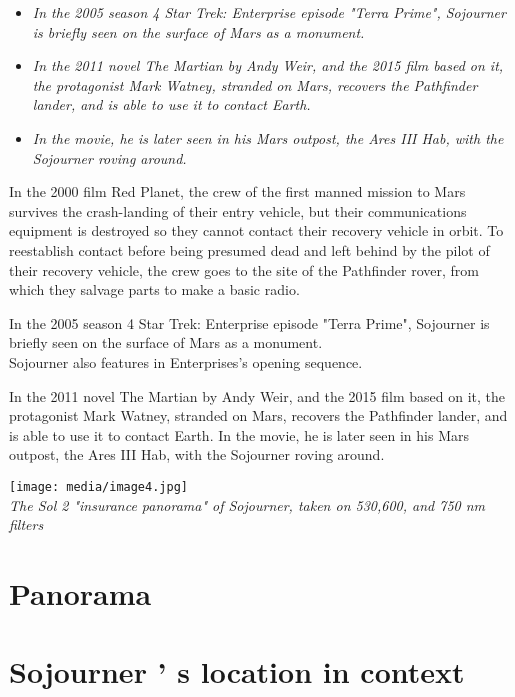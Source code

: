 \begin{itemize}
\item
  \emph{In the 2005 season 4 Star Trek: Enterprise episode "Terra
  Prime", Sojourner is briefly seen on the surface of Mars as a
  monument.}
\item
  \emph{In the 2011 novel The Martian by Andy Weir, and the 2015 film
  based on it, the protagonist Mark Watney, stranded on Mars, recovers
  the Pathfinder lander, and is able to use it to contact Earth.}
\item
  \emph{In the movie, he is later seen in his Mars outpost, the Ares III
  Hab, with the Sojourner roving around.}
\end{itemize}

In the 2000 film Red Planet, the crew of the first manned mission to
Mars survives the crash-landing of their entry vehicle, but their
communications equipment is destroyed so they cannot contact their
recovery vehicle in orbit. To reestablish contact before being presumed
dead and left behind by the pilot of their recovery vehicle, the crew
goes to the site of the Pathfinder rover, from which they salvage parts
to make a basic radio.

In the 2005 season 4 Star Trek: Enterprise episode "Terra Prime",
Sojourner is briefly seen on the surface of Mars as a monument.\\
Sojourner also features in Enterprises's opening sequence.

In the 2011 novel The Martian by Andy Weir, and the 2015 film based on
it, the protagonist Mark Watney, stranded on Mars, recovers the
Pathfinder lander, and is able to use it to contact Earth. In the movie,
he is later seen in his Mars outpost, the Ares III Hab, with the
Sojourner roving around.

\texttt{[image: media/image4.jpg]}\\
\emph{The Sol 2 "insurance panorama" of Sojourner, taken on 530,600, and
750 nm filters}

\section{Panorama}\label{panorama}

\section{Sojourner ' s location in
context}\label{sojourner-s-location-in-context}

